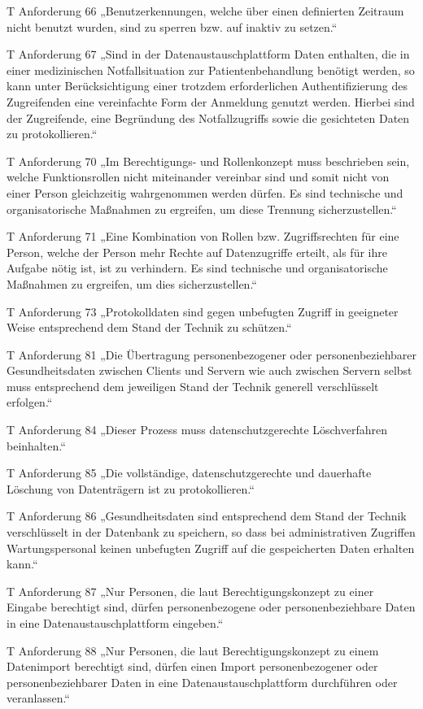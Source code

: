 T Anforderung 66
„Benutzerkennungen, welche über einen definierten Zeitraum nicht benutzt wurden, sind zu sperren bzw. auf inaktiv zu setzen.“

T Anforderung 67
„Sind in der Datenaustauschplattform Daten enthalten, die in einer medizinischen Notfallsituation zur Patientenbehandlung benötigt werden, so kann unter Berücksichtigung einer trotzdem erforderlichen Authentifizierung des Zugreifenden eine vereinfachte Form der Anmeldung genutzt werden. Hierbei sind der Zugreifende, eine Begründung des Notfallzugriffs sowie die gesichteten Daten zu protokollieren.“

T Anforderung 70
„Im Berechtigungs- und Rollenkonzept muss beschrieben sein, welche Funktionsrollen nicht miteinander vereinbar sind und somit nicht von einer Person gleichzeitig wahrgenommen werden dürfen. Es sind technische und organisatorische Maßnahmen zu ergreifen, um diese Trennung sicherzustellen.“

T Anforderung 71
„Eine Kombination von Rollen bzw. Zugriffsrechten für eine Person, welche der Person mehr Rechte auf Datenzugriffe erteilt, als für ihre Aufgabe nötig ist, ist zu verhindern. Es sind technische und organisatorische Maßnahmen zu ergreifen, um dies sicherzustellen.“

T Anforderung 73
„Protokolldaten sind gegen unbefugten Zugriff in geeigneter Weise entsprechend dem Stand der Technik zu schützen.“

T Anforderung 81
„Die Übertragung personenbezogener oder personenbeziehbarer Gesundheitsdaten zwischen Clients und Servern wie auch zwischen Servern selbst muss entsprechend dem jeweiligen Stand der Technik generell verschlüsselt erfolgen.“

T Anforderung 84
„Dieser Prozess muss datenschutzgerechte Löschverfahren beinhalten.“

T Anforderung 85
„Die vollständige, datenschutzgerechte und dauerhafte Löschung von Datenträgern ist zu protokollieren.“

T Anforderung 86
„Gesundheitsdaten sind entsprechend dem Stand der Technik verschlüsselt in der Datenbank zu speichern, so dass bei administrativen Zugriffen Wartungspersonal keinen unbefugten Zugriff auf die gespeicherten Daten erhalten kann.“

T Anforderung 87
„Nur Personen, die laut Berechtigungskonzept zu einer Eingabe berechtigt sind, dürfen personenbezogene oder personenbeziehbare Daten in eine Datenaustauschplattform eingeben.“

T Anforderung 88
„Nur Personen, die laut Berechtigungskonzept zu einem Datenimport berechtigt sind, dürfen einen Import personenbezogener oder personenbeziehbarer Daten in eine Datenaustauschplattform durchführen oder veranlassen.“

